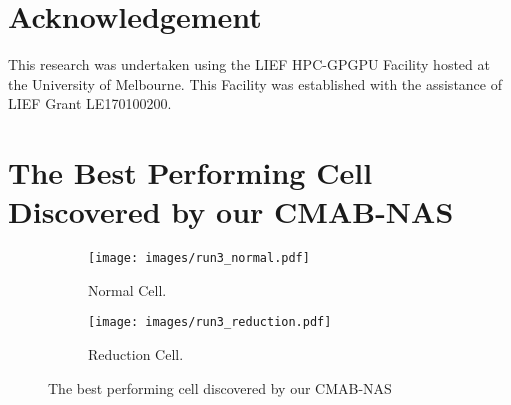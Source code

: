 \documentclass[conference]{IEEEtran}
\begin{document}
\section{Acknowledgement}
This research was undertaken using the LIEF HPC-GPGPU Facility hosted at the University of Melbourne. This Facility was established with the assistance of LIEF Grant LE170100200.




\appendix
\section{The Best Performing Cell Discovered by our CMAB-NAS}\label{sec:cell}

\begin{figure}[H]
	\centering
	\begin{subfigure}{0.48\linewidth}
		\texttt{[image: images/run3\_normal.pdf]}
        \caption{Normal Cell.}
		\label{fig:run3_normal}
	\end{subfigure}
	\begin{subfigure}{0.48\linewidth} 
		\texttt{[image: images/run3\_reduction.pdf]}
        \caption{Reduction Cell.}
		\label{fig:run3_reduce}
	\end{subfigure}
	\caption{The best performing cell discovered by our CMAB-NAS}
\end{figure}
\end{document}
